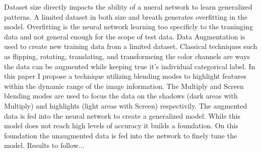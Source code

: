 % 
% 
%
Dataset size directly impacts the ability of a nueral network to learn generalized patterns.  A limited dataset in both size and breath generates overfitting in the model.  Overfitting is the neural network learning too specificly to the traninging data and not general enough for the scope of test data.  Data Augmentation is used to create new training data from a limited dataset.  Classical techniques such as flipping, rotating, translating, and transformeing the color channels are ways the data can be augmented while keeping true it's individual categorical label.  In this paper I propose a technique utilizing blending modes to highlight features within the dynamic range of the image information.  The Multiply and Screen blending modes are used to focus the data on the shadows (dark areas with Multiply) and highlights (light areas with Screen) respectivily.  The augmented data is fed into the neural network to create a generalized model.  While this model does not reach high levels of accuracy it builds a foundation.  On this foundation the unaugmented data is fed into the network to finely tune the model.  Results to follow...